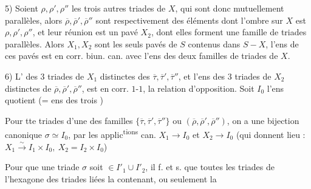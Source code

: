 5) Soient $\rho,\rho',\rho''$ les trois autres triades de $X$, qui sont donc mutuellement parallèles, alors $\overline\rho,\overline\rho',\overline\rho''$ sont  respectivement des éléments dont l'ombre sur $X$ est $\rho,\rho',\rho''$, et leur réunion est un pavé $X_2$, dont elles forment une famille de triades parallèles.
Alors $X_1,X_2$ sont les seuls pavés de $S$ contenus dans $S-X$,   l'ens  de ces pavés est en corr. biun. can. avec l'ens \inserted{$\varepsilon$} des deux familles de triades de $X$.

6) L'  des 3 triades de $X_1$ distinctes des $\overline\tau,\overline\tau',\overline\tau''$, et l'ens  des 3 triades de $X_2$ distinctes de $\overline\rho,\overline\rho',\overline\rho''$, est en corr. $1$-$1$,  la relation d'opposition. 
Soit $I_0$ l'ens quotient (= ens des trois )

Pour tte triades  d'une des familles $\{\overline\tau,\overline\tau',\overline\tau''\}$ ou $(\overline\rho,\overline\rho',\overline\rho'')$,  on a une bijection canonique $\sigma\simeq I_0$,   par les applic\textsuperscript{tions} can. $X_1\longrightarrow I_0$ et $X_2\longrightarrow I_0$ (qui donnent lieu : $X_1\overset{\sim}{\longrightarrow}I_1\times I_0,\ X_2=I_2\times I_0$)


Pour que une triade $\sigma$ soit $\in I'_1\cup I'_2$, il f. et s. que toutes les triades de l'hexagone des triades liées la contenant, ou seulement la


